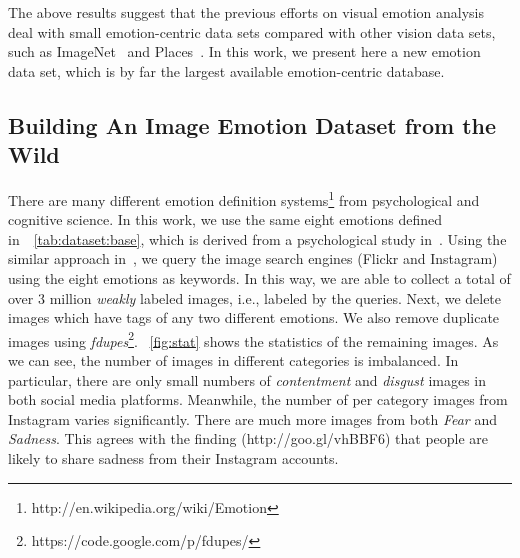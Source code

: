 \documentclass[letterpaper]{article}
\begin{document}


The above results suggest that the previous efforts on visual emotion analysis deal with small emotion-centric data sets compared with other vision data sets, such as ImageNet~\cite{deng2009imagenet} and Places~\cite{zhou2014learning}. In this work, we present here a new emotion data set, which is by far the largest available emotion-centric database.
\subsection{Building An Image Emotion Dataset from the Wild}
There are many different emotion definition systems\footnote{http://en.wikipedia.org/wiki/Emotion} from psychological and cognitive science. In this work, we use the same eight emotions defined in~\tablename~\ref{tab:dataset:base}, which is derived from a psychological study in~\cite{mikels2005emotional}.
Using the similar approach in~\cite{jia2012can}, we query the image search engines (Flickr and Instagram) using the eight emotions as keywords. In this way, we are able to collect a total of over 3 million \textit{weakly} labeled images, i.e., labeled by the queries. Next, we delete images which have tags of any two different emotions. We also remove duplicate images using \textit{fdupes}\footnote{https://code.google.com/p/fdupes/}. \figurename~\ref{fig:stat} shows the statistics of the remaining images. As we can see, the number of images in different categories is imbalanced. In particular, there are only small numbers of \textit{contentment} and \textit{disgust} images in both social media platforms. Meanwhile, the number of per category images from Instagram varies significantly. There are much more images from both \textit{Fear} and \textit{Sadness}. This agrees with the finding (http://goo.gl/vhBBF6) that people are likely to share sadness from their Instagram accounts.
\end{document}
